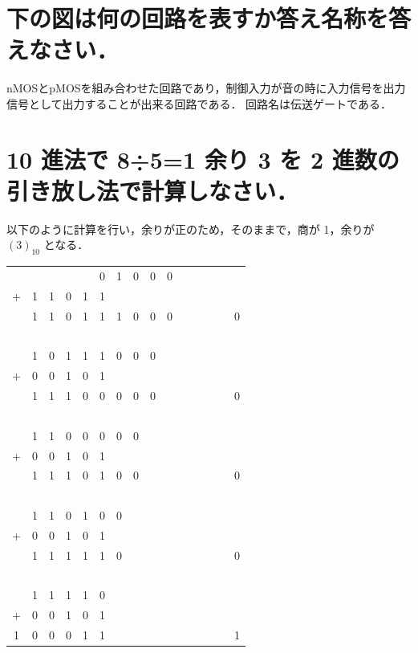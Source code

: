 \documentclass[a4paper,11pt]{ltjsarticle}
\begin{document}
\section{下の図は何の回路を表すか答え名称を答えなさい．}
nMOSとpMOSを組み合わせた回路であり，制御入力が音の時に入力信号を出力信号として出力することが出来る回路である．
回路名は伝送ゲートである．
\section{10 進法で 8÷5=1 余り 3 を 2 進数の引き放し法で計算しなさい．}
以下のように計算を行い，余りが正のため，そのままで，商が 1，余りが $(3)_{10}$ となる．
\begin{table}[!ht]
  \centering
  \begin{tabular}{cccccccccccccc}
    ~ & ~ & ~ & ~ & ~ & 0 & 1 & 0 & 0 & 0 & ~ & ~ & ~ & ~ \\
    + & 1 & 1 & 0 & 1 & 1 & ~ & ~ & ~ & ~ & ~ & ~ & ~ & ~ \\ \hline
    ~ & 1 & 1 & 0 & 1 & 1 & 1 & 0 & 0 & 0 & ~ & ~ & ~ & 0 \\
    ~ & ~ & ~ & ~ & ~ & ~ & ~ & ~ & ~ & ~ & ~ & ~ & ~ & ~ \\
    ~ & 1 & 0 & 1 & 1 & 1 & 0 & 0 & 0 & ~ & ~ & ~ & ~ & ~ \\
    + & 0 & 0 & 1 & 0 & 1 & ~ & ~ & ~ & ~ & ~ & ~ & ~ & ~ \\ \hline
    ~ & 1 & 1 & 1 & 0 & 0 & 0 & 0 & 0 & ~ & ~ & ~ & ~ & 0 \\
    ~ & ~ & ~ & ~ & ~ & ~ & ~ & ~ & ~ & ~ & ~ & ~ & ~ & ~ \\
    ~ & 1 & 1 & 0 & 0 & 0 & 0 & 0 & ~ & ~ & ~ & ~ & ~ & ~ \\
    + & 0 & 0 & 1 & 0 & 1 & ~ & ~ & ~ & ~ & ~ & ~ & ~ & ~ \\ \hline
    ~ & 1 & 1 & 1 & 0 & 1 & 0 & 0 & ~ & ~ & ~ & ~ & ~ & 0 \\
    ~ & ~ & ~ & ~ & ~ & ~ & ~ & ~ & ~ & ~ & ~ & ~ & ~ & ~ \\
    ~ & 1 & 1 & 0 & 1 & 0 & 0 & ~ & ~ & ~ & ~ & ~ & ~ & ~ \\
    + & 0 & 0 & 1 & 0 & 1 & ~ & ~ & ~ & ~ & ~ & ~ & ~ & ~ \\ \hline
    ~ & 1 & 1 & 1 & 1 & 1 & 0 & ~ & ~ & ~ & ~ & ~ & ~ & 0 \\
    ~ & ~ & ~ & ~ & ~ & ~ & ~ & ~ & ~ & ~ & ~ & ~ & ~ & ~ \\
    ~ & 1 & 1 & 1 & 1 & 0 & ~ & ~ & ~ & ~ & ~ & ~ & ~ & ~ \\
    + & 0 & 0 & 1 & 0 & 1 & ~ & ~ & ~ & ~ & ~ & ~ & ~ & ~ \\ \hline
    1 & 0 & 0 & 0 & 1 & 1 & ~ & ~ & ~ & ~ & ~ & ~ & ~ & 1 \\
  \end{tabular}
\end{table}
\end{document}
